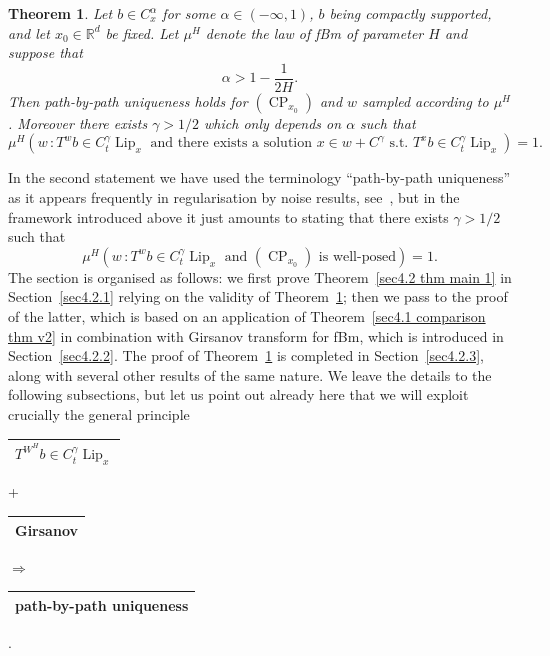 \documentclass[10pt]{article}
\newcommand{\tmop}[1]{\ensuremath{\operatorname{#1}}}
\newtheorem{theorem}{Theorem}
\begin{document}
\begin{theorem}
  \label{sec4.2 thm main 2}Let $b \in C^{\alpha}_x$ for some $\alpha \in (-
  \infty, 1)$, $b$ being compactly supported, and let $x_0 \in \mathbb{R}^d$
  be fixed. Let $\mu^H$ denote the law of fBm of parameter $H$ and suppose
  that
  \[ \alpha > 1 - \frac{1}{2 H} . \]
  Then path\mbox{-}by\mbox{-}path uniqueness holds for $(\tmop{CP}_{x_0})$ and
  $w$ sampled according to $\mu^H$. Moreover there exists $\gamma > 1 / 2$
  which only depends on $\alpha$ such that
  \[ \mu^H \left( w \, : T^w b \in C^{\gamma}_t \tmop{Lip}_x \text{ and there
     exists a solution $x \in w + C^{\gamma}$ s.t. } T^x b \in C^{\gamma}_t
     \tmop{Lip}_x \right) = 1. \]
\end{theorem}

In the second statement we have used the terminology
``path\mbox{-}by\mbox{-}path uniqueness'' as it appears frequently in
regularisation by noise results, see~{\cite{flandoli}}, but in the framework
introduced above it just amounts to stating that there exists $\gamma > 1 / 2$
such that
\[ \mu^H \left( w \, : T^w b \in C^{\gamma}_t \tmop{Lip}_x \text{ and
   $(\tmop{CP}_{x_0})$ is well-posed} \right) = 1. \]
The section is organised as follows: we first prove Theorem~\ref{sec4.2 thm
main 1} in Section~\ref{sec4.2.1} relying on the validity of
Theorem~\ref{sec4.2 thm main 2}; then we pass to the proof of the latter,
which is based on an application of Theorem~\ref{sec4.1 comparison thm v2} in
combination with Girsanov transform for fBm, which is introduced in
Section~\ref{sec4.2.2}. The proof of Theorem~\ref{sec4.2 thm main 2} is
completed in Section~\ref{sec4.2.3}, along with several other results of the
same nature. We leave the details to the following subsections, but let us
point out already here that we will exploit crucially the general principle

\begin{center}
  \begin{tabular}{|l|}
    \hline
    $T^{W^H} b \in C^{\gamma}_t \tmop{Lip}_x$\\
    \hline
  \end{tabular}\enspace +\enspace\begin{tabular}{|l|}
    \hline
    Girsanov\\
    \hline
  \end{tabular}\enspace$\Longrightarrow$\enspace\begin{tabular}{|l|}
    \hline
    path-by-path uniqueness\\
    \hline
  \end{tabular}.
\end{center}
\end{document}
